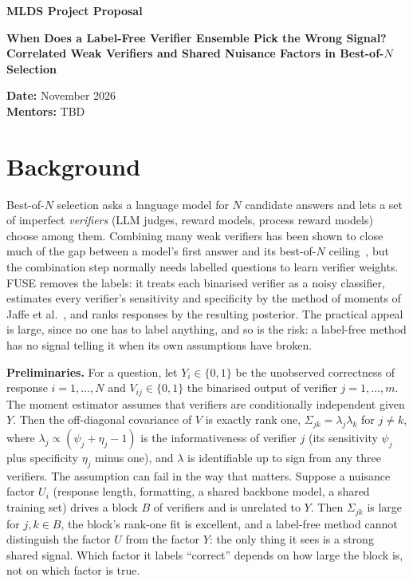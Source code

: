 \documentclass[11pt]{article}
\newcommand{\proposalname}{MLDS Project Proposal}
\begin{document}
{\Large\bfseries \proposalname\par}
\vspace{0.2em}
{\large\bfseries When Does a Label-Free Verifier Ensemble Pick the Wrong Signal?\\
Correlated Weak Verifiers and Shared Nuisance Factors in Best-of-$N$ Selection\par}
\vspace{0.6em}

\textbf{Date:} November 2026\\
\textbf{Mentors:} TBD

\section*{Background}

Best-of-$N$ selection asks a language model for $N$ candidate answers and lets a set of
imperfect \emph{verifiers} (LLM judges, reward models, process reward models) choose
among them. Combining many weak verifiers has been shown to close much of the gap
between a model's first answer and its best-of-$N$ ceiling~\cite{weaver}, but the
combination step normally needs labelled questions to learn verifier weights. FUSE
\cite{fuse} removes the labels: it treats each binarised verifier as a noisy classifier,
estimates every verifier's sensitivity and specificity by the method of moments of
Jaffe et al.~\cite{jaffe}, and ranks responses by the resulting posterior. The practical
appeal is large, since no one has to label anything, and so is the risk: a label-free
method has no signal telling it when its own assumptions have broken.

\textbf{Preliminaries.} For a question, let $Y_i\in\{0,1\}$ be the unobserved correctness
of response $i=1,\dots,N$ and $V_{ij}\in\{0,1\}$ the binarised output of verifier
$j=1,\dots,m$. The moment estimator assumes that verifiers are conditionally independent
given $Y$. Then the off-diagonal covariance of $V$ is exactly rank one,
$\Sigma_{jk}=\lambda_j\lambda_k$ for $j\neq k$, where $\lambda_j\propto
(\psi_j+\eta_j-1)$ is the informativeness of verifier $j$ (its sensitivity $\psi_j$ plus
specificity $\eta_j$ minus one), and $\lambda$ is identifiable up to
sign from any three verifiers. The assumption can fail in the way that matters. Suppose
a nuisance factor $U_i$ (response length, formatting, a shared backbone model, a shared
training set) drives a block $B$ of verifiers and is unrelated to $Y$. Then
$\Sigma_{jk}$ is large for $j,k\in B$, the block's rank-one fit is excellent, and a
label-free method cannot distinguish the factor $U$ from the factor $Y$: the only thing
it sees is a strong shared signal. Which factor it labels ``correct'' depends on how large
the block is, not on which factor is true.
\end{document}

